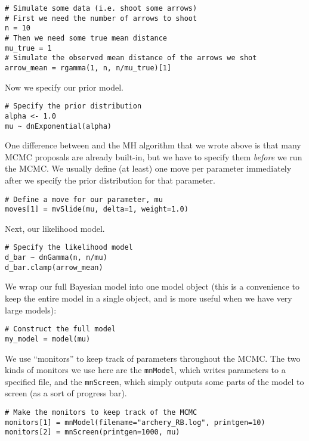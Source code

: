 {\tt \begin{snugshade*}
\begin{lstlisting}    
# Simulate some data (i.e. shoot some arrows)
# First we need the number of arrows to shoot
n = 10
# Then we need some true mean distance
mu_true = 1
# Simulate the observed mean distance of the arrows we shot
arrow_mean = rgamma(1, n, n/mu_true)[1]
\end{lstlisting}
\end{snugshade*}}

Now we specify our prior model.
{\tt \begin{snugshade*}
\begin{lstlisting}    
# Specify the prior distribution
alpha <- 1.0
mu ~ dnExponential(alpha)
\end{lstlisting}
\end{snugshade*}}

One difference between \RevBayes and the MH algorithm that we wrote above is that many MCMC proposals are already built-in, but we have to specify them \emph{before} we run the MCMC.
We usually define (at least) one move per parameter immediately after we specify the prior distribution for that parameter.

{\tt \begin{snugshade*}
\begin{lstlisting}    
# Define a move for our parameter, mu
moves[1] = mvSlide(mu, delta=1, weight=1.0)
\end{lstlisting}
\end{snugshade*}}

Next, our likelihood model.
{\tt \begin{snugshade*}
\begin{lstlisting}    
# Specify the likelihood model
d_bar ~ dnGamma(n, n/mu)
d_bar.clamp(arrow_mean)
\end{lstlisting}
\end{snugshade*}}

We wrap our full Bayesian model into one model object (this is a convenience to keep the entire model in a single object, and is more useful when we have very large models):
{\tt \begin{snugshade*}
\begin{lstlisting}    
# Construct the full model
my_model = model(mu)
\end{lstlisting}
\end{snugshade*}}

We use ``monitors'' to keep track of parameters throughout the MCMC.
The two kinds of monitors we use here are the \texttt{mnModel}, which writes parameters to a specified file, and the \texttt{mnScreen}, which simply outputs some parts of the model to screen (as a sort of progress bar).
{\tt \begin{snugshade*}
\begin{lstlisting}    
# Make the monitors to keep track of the MCMC
monitors[1] = mnModel(filename="archery_RB.log", printgen=10)
monitors[2] = mnScreen(printgen=1000, mu)
\end{lstlisting}
\end{snugshade*}}


